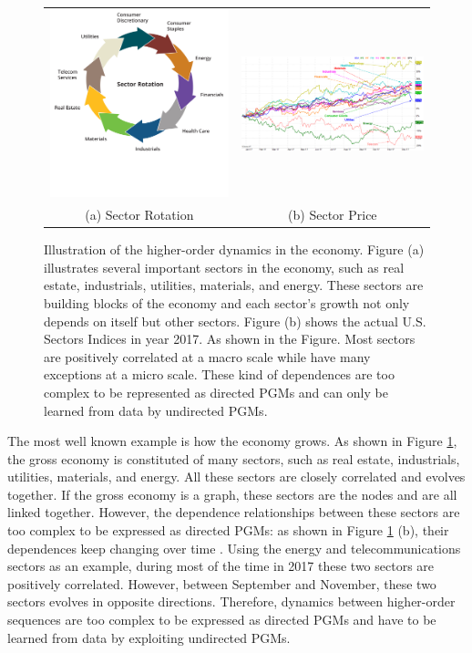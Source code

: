 \begin{figure}[h]
  \centering
  \begin{tabular}{cc}
    \includegraphics[width=0.3\linewidth]{figures/intro_sector.png}
    &
      \includegraphics[width=0.7\linewidth]{figures/intro_rotation_price.png}\\
    {\small (a) Sector Rotation}& {\small (b) Sector Price}\\
  \end{tabular}
  \caption{\label{fig:intro_fractal} Illustration of the
    higher-order dynamics in the economy. Figure (a) illustrates
    several important sectors in the economy, such as real
    estate, industrials, utilities, materials, and energy. These
    sectors are building blocks of the economy and each sector's
    growth not only depends on itself but other sectors. Figure
    (b) shows the actual U.S. Sectors Indices in year 2017. As
    shown in the Figure. Most sectors are positively correlated
    at a macro scale while have many exceptions at a micro scale.
    These kind of dependences are too complex to be represented
    as directed PGMs and can only be learned from data by
    undirected PGMs.}
\end{figure}

The most well known example is how the economy grows. As shown in
Figure \ref{fig:intro_fractal}, the gross economy is constituted
of many sectors, such as real estate, industrials, utilities,
materials, and energy. All these sectors are closely correlated
and evolves together. If the gross economy is a graph, these
sectors are the nodes and are all linked together. However, the
dependence relationships between these sectors are too complex to
be expressed as directed PGMs: as shown in Figure
\ref{fig:intro_fractal} (b), their dependences keep changing over
time
\cite{lo1990contrarian,mech1993portfolio,brennan1993investment}.
Using the energy and telecommunications sectors as an example,
during most of the time in 2017 these two sectors are positively
correlated. However, between September and November, these two
sectors evolves in opposite directions. Therefore, dynamics
between higher-order sequences are too complex to be expressed as
directed PGMs and have to be learned from data by exploiting
undirected PGMs.


